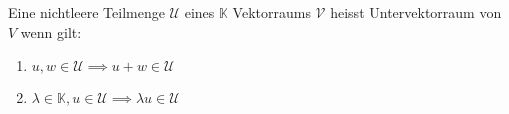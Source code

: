 Eine nichtleere Teilmenge $\mathcal{U}$ eines $\mathbb{K}$ Vektorraums $\mathcal{V}$ heisst Untervektorraum von $V$ wenn gilt:
\begin{enumerate}
	\item $u,w \in \mathcal{U} \implies u + w \in \mathcal{U}$ 
	\item $\lambda \in \mathbb{K}, u \in \mathcal{U} \implies \lambda u \in \mathcal{U}$ 
\end{enumerate}


